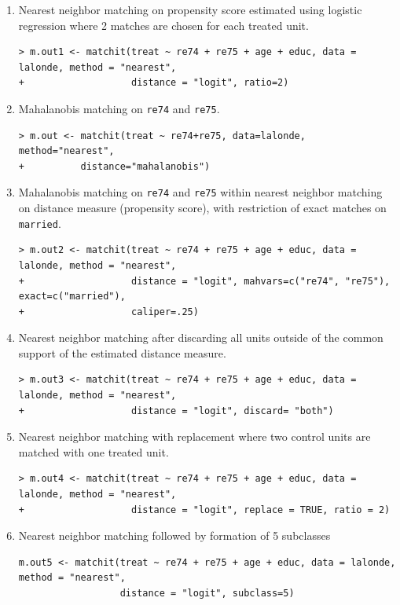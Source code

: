 \documentclass[oneside,letterpaper,titlepage]{article}
\begin{document}
\begin{enumerate}

\item Nearest neighbor matching on propensity score estimated using
  logistic regression where 2 matches are chosen for each treated unit.
\begin{verbatim}
> m.out1 <- matchit(treat ~ re74 + re75 + age + educ, data = lalonde, method = "nearest", 
+                   distance = "logit", ratio=2)
\end{verbatim}

\item Mahalanobis matching on {\tt re74} and {\tt re75}.
\begin{verbatim}
> m.out <- matchit(treat ~ re74+re75, data=lalonde, method="nearest", 
+  		   distance="mahalanobis")
\end{verbatim}

\item Mahalanobis matching on {\tt re74} and {\tt re75} within nearest
  neighbor matching on distance measure (propensity score), with restriction of exact
  matches on {\tt married}.
\begin{verbatim}
> m.out2 <- matchit(treat ~ re74 + re75 + age + educ, data = lalonde, method = "nearest", 
+                   distance = "logit", mahvars=c("re74", "re75"), exact=c("married"), 
+                   caliper=.25)
\end{verbatim}

\item Nearest neighbor matching after discarding all units outside of
  the common support of the estimated distance measure.
\begin{verbatim}
> m.out3 <- matchit(treat ~ re74 + re75 + age + educ, data = lalonde, method = "nearest", 
+                   distance = "logit", discard= "both")
\end{verbatim}

\item Nearest neighbor matching with replacement where two control
  units are matched with one treated unit.
\begin{verbatim}
> m.out4 <- matchit(treat ~ re74 + re75 + age + educ, data = lalonde, method = "nearest", 
+                   distance = "logit", replace = TRUE, ratio = 2)
\end{verbatim}

\item Nearest neighbor matching followed by formation of 5 subclasses
\begin{verbatim}
m.out5 <- matchit(treat ~ re74 + re75 + age + educ, data = lalonde, method = "nearest", 
                  distance = "logit", subclass=5)
\end{verbatim}
\end{enumerate}
\end{document}
